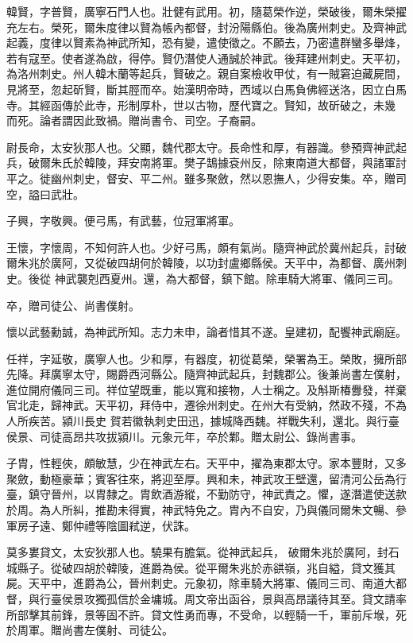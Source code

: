 \begin{pinyinscope}
 韓賢，字普賢，廣寧石門人也。壯健有武用。初，隨葛榮作逆，榮破後，爾朱榮擢充左右。榮死，爾朱度律以賢為帳內都督，封汾陽縣伯。後為廣州刺史。及齊神武起義，度律以賢素為神武所知，恐有變，遣使徵之。不願去，乃密遣群蠻多舉烽，若有寇至。使者遂為啟，得停。賢仍潛使人通誠於神武。後拜建州刺史。天平初，為洛州刺史。州人韓木蘭等起兵，賢破之。親自案檢收甲仗，有一賊窘迫藏屍間，見將至，忽起斫賢，斷其脛而卒。始漢明帝時，西域以白馬負佛經送洛，因立白馬寺。其經函傳於此寺，形制厚朴，世以古物，歷代寶之。賢知，故斫破之，未幾
 而死。論者謂因此致禍。贈尚書令、司空。子裔嗣。



 尉長命，太安狄那人也。父顯，魏代郡太守。長命性和厚，有器識。參預齊神武起兵，破爾朱氏於韓陵，拜安南將軍。樊子鵠據袞州反，除東南道大都督，與諸軍討平之。徙幽州刺史，督安、平二州。雖多聚斂，然以恩撫人，少得安集。卒，贈司空，謚曰武壯。



 子興，字敬興。便弓馬，有武藝，位冠軍將軍。



 王懷，字懷周，不知何許人也。少好弓馬，頗有氣尚。隨齊神武於冀州起兵，討破爾朱兆於廣阿，又從破四胡何於韓陵，以功封盧鄉縣侯。天平中，為都督、廣州刺史。後從
 神武襲剋西夏州。還，為大都督，鎮下館。除車騎大將軍、儀同三司。



 卒，贈司徒公、尚書僕射。



 懷以武藝勳誠，為神武所知。志力未申，論者惜其不遂。皇建初，配饗神武廟庭。



 任祥，字延敬，廣寧人也。少和厚，有器度，初從葛榮，榮署為王。榮敗，擁所部先降。拜廣寧太守，賜爵西河縣公。隨齊神武起兵，封魏郡公。後兼尚書左僕射，進位開府儀同三司。祥位望既重，能以寬和接物，人士稱之。及斛斯椿釁發，祥棄官北走，歸神武。天平初，拜侍中，遷徐州刺史。在州大有受納，然政不殘，不為人所疾苦。潁川長史
 賀若徽執刺史田迅，據城降西魏。祥戰失利，還北。與行臺侯景、司徒高昂共攻拔潁川。元象元年，卒於鄴。贈太尉公、錄尚書事。



 子胄，性輕俠，頗敏慧，少在神武左右。天平中，擢為東郡太守。家本豐財，又多聚斂，動極豪華；賓客往來，將迎至厚。興和未，神武攻王壁還，留清河公岳為行臺，鎮守晉州，以胄隸之。胄飲酒游縱，不勤防守，神武責之。懼，遂潛遣使送款於周。為人所糾，推勘未得實，神武特免之。胄內不自安，乃與儀同爾朱文暢、參軍房子遠、鄭仲禮等陰圖弒逆，伏誅。



 莫多婁貸文，太安狄那人也。驍果有膽氣。從神武起兵，
 破爾朱兆於廣阿，封石城縣子。從破四胡於韓陵，進爵為侯。從平爾朱兆於赤谼嶺，兆自縊，貸文獲其屍。天平中，進爵為公，晉州刺史。元象初，除車騎大將軍、儀同三司、南道大都督，與行臺侯景攻獨孤信於金墉城。周文帝出函谷，景與高昂議待其至。貸文請率所部擊其前鋒，景等固不許。貸文性勇而專，不受命，以輕騎一千，軍前斥堠，死於周軍。贈尚書左僕射、司徒公。




\end{pinyinscope}
